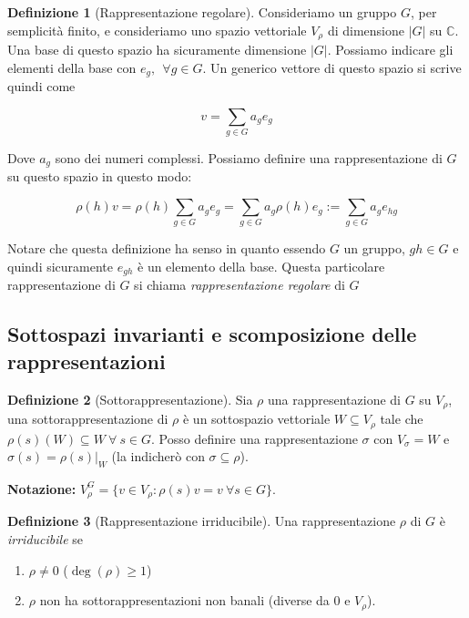 \documentclass[11pt]{article}
\theoremstyle{plain}
\theoremstyle{definition}
\newtheorem{defn}{Definizione}[section]
\theoremstyle{remark}
\newcommand{\C}{\mathbb{C}}
\newcommand{\dsum}{\displaystyle\sum}
\begin{document}
\begin{defn}[Rappresentazione regolare]
  Consideriamo un gruppo $G$, per semplicità finito, e consideriamo uno spazio vettoriale $V_\rho$ di dimensione $|G|$ su $\C$. Una base di questo spazio ha sicuramente dimensione $|G|$. Possiamo indicare gli elementi della base con $e_g, \ \ \forall g \in G$. Un generico vettore di questo spazio si scrive quindi come

  \[ v = \dsum_{g \in G} a_g e_g \]

  Dove $a_g$ sono dei numeri complessi. Possiamo definire una rappresentazione di $G$ su questo spazio in questo modo:

  \[ \rho(h)v = \rho(h) \dsum_{g \in G} a_g e_g = \dsum_{g\in G} a_g \rho(h) e_g := \dsum_{g \in G} a_g e_{hg} \]

  Notare che questa definizione ha senso in quanto essendo $G$ un gruppo, $gh \in G$ e quindi sicuramente $e_{gh}$ è un elemento della base. Questa particolare rappresentazione di $G$ si chiama \emph{rappresentazione regolare} di $G$


  
  \label{defn:rappresentazione regolare}
\end{defn}



\subsection{Sottospazi invarianti e scomposizione delle rappresentazioni}



\begin{defn}[Sottorappresentazione]
Sia $\rho$ una rappresentazione di $G$ su $V_{\rho}$, una sottorappresentazione di $\rho$ è un sottospazio vettoriale $W\subseteq V_{\rho}$ tale che $\rho(s)(W)\subseteq W\ \forall\ s\in G$. Posso definire una rappresentazione $\sigma$ con $V_{\sigma}=W$ e $\sigma(s)=\rho(s)|_W$ (la indicherò con $\sigma\subseteq \rho$).
\end{defn}

\textbf{Notazione:} $V_{\rho}^G=\{v\in V_{\rho}: \rho(s)v=v\ \forall s\in G\}$.


\begin{defn}[Rappresentazione irriducibile]
Una rappresentazione $\rho$ di $G$ è \textit{irriducibile} se
\begin{enumerate}
	\item $\rho \neq 0$ ($\deg(\rho) \geq 1$)
	\item $\rho$ non ha sottorappresentazioni non banali (diverse da 0 e $V_{\rho}$).
\end{enumerate}

\end{defn}
\end{document}
